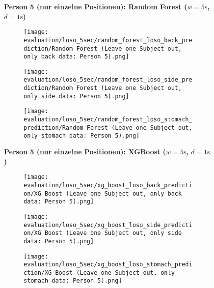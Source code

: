 \begin{figure}
    \textbf{Person 5 (nur einzelne Positionen): Random Forest ($w=5\si{\s}$, $d=1\si{\s}$)}
      \centering
      \begin{subfigure}{1\textwidth}
          \texttt{[image: evaluation/loso\_5sec/random\_forest\_loso\_back\_prediction/Random Forest (Leave one Subject out, only back data: Person 5).png]}
        \end{subfigure}
        \begin{subfigure}{1\textwidth}
          \texttt{[image: evaluation/loso\_5sec/random\_forest\_loso\_side\_prediction/Random Forest (Leave one Subject out, only side data: Person 5).png]}
        \end{subfigure}
        \begin{subfigure}{1\textwidth}
          \texttt{[image: evaluation/loso\_5sec/random\_forest\_loso\_stomach\_prediction/Random Forest (Leave one Subject out, only stomach data: Person 5).png]}
      \end{subfigure}
        \textbf{Person 5 (nur einzelne Positionen): XGBoost ($w=5\si{\s}$, $d=1\si{\s}$)}
      \centering
      \begin{subfigure}{1\textwidth}
          \texttt{[image: evaluation/loso\_5sec/xg\_boost\_loso\_back\_prediction/XG Boost (Leave one Subject out, only back data: Person 5).png]}
        \end{subfigure}
        \begin{subfigure}{1\textwidth}
            \texttt{[image: evaluation/loso\_5sec/xg\_boost\_loso\_side\_prediction/XG Boost (Leave one Subject out, only side data: Person 5).png]}
        \end{subfigure}
        \begin{subfigure}{1\textwidth}
            \texttt{[image: evaluation/loso\_5sec/xg\_boost\_loso\_stomach\_prediction/XG Boost (Leave one Subject out, only stomach data: Person 5).png]}
      \end{subfigure}
  
      \label{evaluation:xgboost_loso:person6}
\end{figure}
